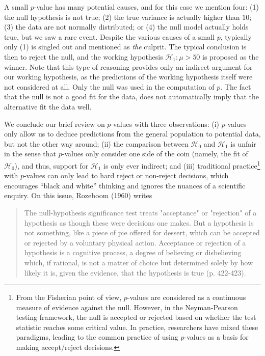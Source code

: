 \documentclass[english,,doc,floatsintext]{apa6}
\begin{document}
A small \(p\)-value has many potential causes, and for this case we mention four: (1) the null hypothesis is not true; (2) the true variance is actually higher than \(10\); (3) the data are not normally distributed; or (4) the null model actually holds true, but we saw a rare event. Despite the various causes of a small \(p\), typically only (1) is singled out and mentioned as \emph{the} culprit. The typical conclusion is then to reject the null, and the working hypothesis \(\mathcal{H}_{1} : \mu > 50\) is proposed as the winner. Note that this type of reasoning provides only an indirect argument for our working hypothesis, as the predictions of the working hypothesis itself were not considered at all. Only the null was used in the computation of \(p\). The fact that the null is not a good fit for the data, does not automatically imply that the alternative fit the data well.

We conclude our brief review on \(p\)-values with three observations: (i) \(p\)-values only allow us to deduce predictions from the general population to potential data, but not the other way around; (ii) the comparison between \(\mathcal{H}_{0}\) and \(\mathcal{H}_{1}\) is unfair in the sense that \(p\)-values only consider one side of the coin (namely, the fit of \(\mathcal{H}_{0}\)), and thus, support for \(\mathcal{H}_1\) is only ever indirect; and (iii) traditional practice\footnote{From the Fisherian point of view, $p$-values are considered as a continuous measure of evidence against the null. However, in the Neyman-Pearson testing framework, the null is accepted or rejected based on whether the test statistic reaches some critical value. In practice, researchers have mixed these paradigms, leading to the common practice of using $p$-values as a basis for making accept/reject decisions. } with \(p\)-values can only lead to hard reject or non-reject decisions, which encourages \enquote{black and white} thinking and ignores the nuances of a scientific enquiry. On this issue, Rozeboom (1960) writes

\begin{quote}
The null-hypothesis significance test treats "acceptance" or "rejection" of a hypothesis as though these were decisions one makes. But a hypothesis is not something, like a piece of pie offered for dessert, which can be accepted or rejected by a voluntary physical action. Acceptance or rejection of a hypothesis is a cognitive process, a degree of believing or disbelieving which, if rational, is not a matter of choice but determined solely by how likely it is, given the evidence, that the hypothesis is true (p. 422-423).
\end{quote}
\end{document}
